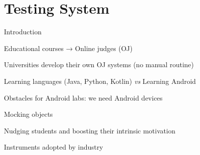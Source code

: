 \documentclass{beamer}%
\begin{document}
\section[Testing System]{Testing System}
\begin{frame}{Introduction}

Educational courses → { Online judges (OJ) }

Universities develop their own OJ systems (no manual routine)

Learning languages (Java, Python, Kotlin) \textit{vs} Learning Android

Obstacles for Android labs: we need Android devices

Mocking objects

Nudging students and boosting their intrinsic motivation

Instruments adopted by industry




\end{frame}
\end{document}
